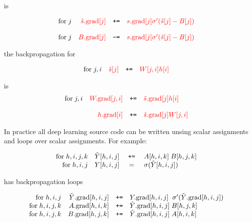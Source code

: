 {\vfill
is

\vfill
$$\begin{array}{lrcl}
\mathrm{for}\;j & {\color{red} \tilde{s}.\mathrm{grad}[j]} & \mbox{\tt +=} & {\color{red} s.\mathrm{grad}[j]\sigma'(\tilde{s}[j] - B[j])} \\
\\
\mathrm{for}\;j & {\color{red} B.\mathrm{grad}[j]} & \mbox{\tt -=} & {\color{red} s.\mathrm{grad}[j]\sigma'(\tilde{s}[j] - B[j])}
\end{array}$$

the backpropagation for

$$\begin{array}{lrcl}
\mathrm{for}\;j,i & {\color{red} \tilde{s}[j]} & \mbox{\tt +=} & {\color{red} W[j,i]h[i]}
\end{array}$$

\vfill
is
$$\begin{array}{lrcl}
\mathrm{for}\;j,i & {\color{red} W.\mathrm{grad}[j,i]} & \mbox{\tt +=} & {\color{red} \tilde{s}.\mathrm{grad}[j] h[i]} \\
\\
& {\color{red} h.\mathrm{grad}[i]} & \mbox{\tt +=} & {\color{red} \tilde{s}.\mathrm{grad}[j] W[j,i]} \\
\end{array}$$


In practice all deep learning source code can be written unsing scalar assignments and loops over scalar assignments.
For example:

$$\begin{array}{rrcl}
\mathrm{for}\; h,i,j,k & \tilde{Y}[h,i,j] & \;\mbox{\tt +=}\; & A[h,i,k]\;B[h,j,k] \\
\mathrm{for}\; h,i,j & Y[h,i,j] & = & \sigma(\tilde{Y}[h,i,j])
\end{array}$$

\vfill
has backpropagation loops

$$\begin{array}{rrcl}
\mathrm{for}\;h,i,j & \tilde{Y}.\mathrm{grad}[h,i,j] & \mbox{\tt +=} & Y.\mathrm{grad}[h,i,j]\;\;\sigma'(\tilde{Y}.\mathrm{grad}[h,i,j]) \\
\mathrm{for}\;h,i,j,k & A.\mathrm{grad}[h,i,k] & \mbox{\tt +=} & \tilde{Y}.\mathrm{grad}[h,i,j] \;B[h,j,k] \\
\mathrm{for}\;h,i,j,k & B.\mathrm{grad}[h,j,k] & \mbox{\tt +=} & \tilde{Y}.\mathrm{grad}[h,i,j]\;A[h,i,k]
\end{array}$$

}


